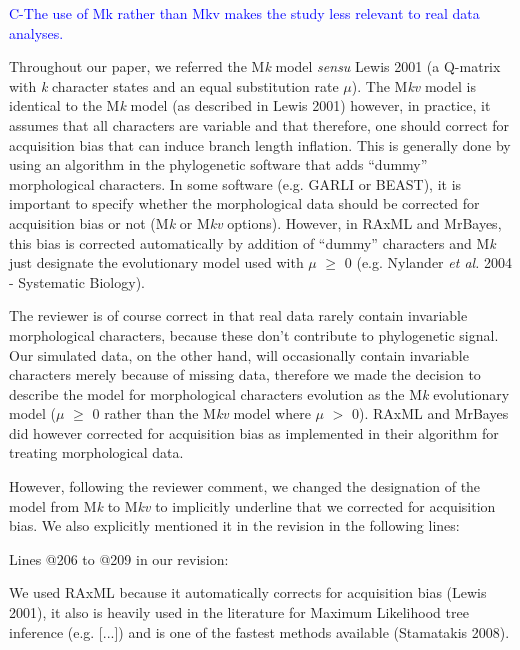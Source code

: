 \documentclass[11pt]{letter}
\begin{document}
\begin{letter}{}
\textcolor{blue}{C-The use of Mk rather than Mkv makes the study less relevant to real data analyses.}


Throughout our paper, we referred the M\textit{k} model \textit{sensu} Lewis 2001 (a Q-matrix with \textit{k} character states and an equal substitution rate $\mu$). The M\textit{kv} model is identical to the M\textit{k} model (as described in Lewis 2001) however, in practice, it assumes that all characters are variable and that therefore, one should correct for acquisition bias that can induce branch length inflation. This is generally done by using an algorithm in the phylogenetic software that adds ``dummy'' morphological characters. In some software (e.g. GARLI or BEAST), it is important to specify whether the morphological data should be corrected for acquisition bias or not (M\textit{k} or M\textit{kv} options). However, in RAxML and MrBayes, this bias is corrected automatically by addition of ``dummy'' characters and M\textit{k} just designate the evolutionary model used with $\mu$ $\geq$ 0 (e.g. Nylander \textit{et al.} 2004 - Systematic Biology). 

The reviewer is of course correct in that real data rarely contain invariable morphological characters, because these don't contribute to phylogenetic signal. Our simulated data, on the other hand, will occasionally contain invariable characters merely because of missing data, therefore we made the decision to describe the model for morphological characters evolution as the M\textit{k} evolutionary model ($\mu$ $\geq$ 0 rather than the M\textit{kv} model where $\mu$ $>$ 0). RAxML and MrBayes did however corrected for acquisition bias as implemented in their algorithm for treating morphological data.

However, following the reviewer comment, we changed the designation of the model from M\textit{k} to M\textit{kv} to implicitly underline that we corrected for acquisition bias. We also explicitly mentioned it in the revision in the following lines:

Lines @206 to @209 in our revision:

\hfill\begin{minipage}{\dimexpr\textwidth-1cm}
We used RAxML because it automatically corrects for acquisition bias (Lewis 2001), it also is heavily used in the literature for Maximum Likelihood tree inference (e.g. [...]) and is one of the fastest methods available (Stamatakis 2008).
\end{minipage}


\end{letter}
\end{document}
